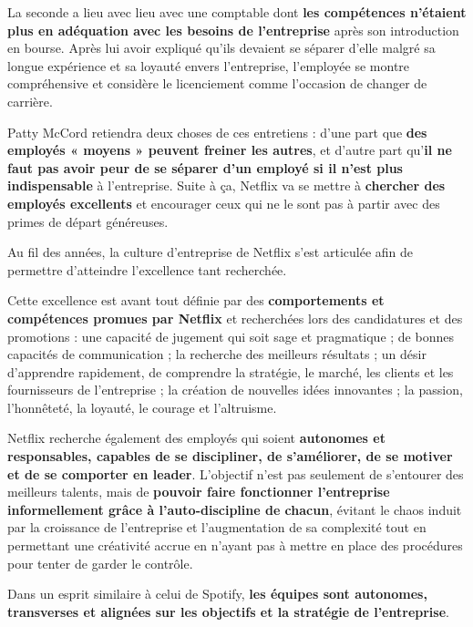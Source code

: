 La seconde a lieu avec lieu avec une comptable dont \textbf{les compétences n'étaient plus en adéquation avec les besoins de l'entreprise} après son introduction en bourse. Après lui avoir expliqué qu'ils devaient se séparer d'elle malgré sa longue expérience et sa loyauté envers l'entreprise, l'employée se montre compréhensive et considère le licenciement comme l'occasion de changer de carrière.

\vspace{5mm}

Patty McCord retiendra deux choses de ces entretiens : d'une part que \textbf{des employés « moyens » peuvent freiner les autres}, et d'autre part qu'\textbf{il ne faut pas avoir peur de se séparer d'un employé si il n'est plus indispensable} à l'entreprise. Suite à ça, Netflix va se mettre à \textbf{chercher des employés excellents} et encourager ceux qui ne le sont pas à partir avec des primes de départ généreuses.

Au fil des années, la culture d'entreprise de Netflix s'est articulée afin de permettre d'atteindre l'excellence tant recherchée. 

\vspace{5mm}

Cette excellence est avant tout définie par des \textbf{comportements et compétences promues par Netflix} et recherchées lors des candidatures et des promotions : une capacité de jugement qui soit sage et pragmatique ; de bonnes capacités de communication ; la recherche des meilleurs résultats ; un désir d'apprendre rapidement, de comprendre la stratégie, le marché, les clients et les fournisseurs de l’entreprise ; la création de nouvelles idées innovantes ; la passion, l'honnêteté, la loyauté, le courage et l'altruisme.

Netflix recherche également des employés qui soient \textbf{autonomes et responsables, capables de se discipliner, de s'améliorer, de se motiver et de se comporter en leader}. L'objectif n'est pas seulement de s'entourer des meilleurs talents, mais de \textbf{pouvoir faire fonctionner l’entreprise informellement grâce à l'auto-discipline de chacun}, évitant le chaos induit par la croissance de l'entreprise et l'augmentation de sa complexité tout en permettant une créativité accrue en n'ayant pas à mettre en place des procédures pour tenter de garder le contrôle.

Dans un esprit similaire à celui de Spotify, \textbf{les équipes sont autonomes, transverses et alignées sur les objectifs et la stratégie de l'entreprise}.

